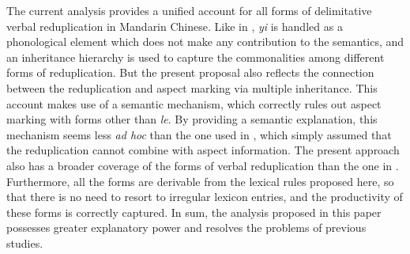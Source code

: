 The current analysis provides a unified account for all forms of delimitative verbal reduplication in Mandarin Chinese.
Like in \citet{FanSongBond2015}, \textit{yi} is handled as a phonological element which does not make any contribution to the semantics,
and an inheritance hierarchy is used to capture the commonalities among different forms of reduplication.
But the present proposal also reflects the connection between the reduplication and aspect marking via multiple inheritance.
This account makes use of a semantic mechanism, which correctly rules out aspect marking with forms other than \textit{le}.
By providing a semantic explanation, this mechanism seems less \textit{ad hoc} than the one used in \citet{FanSongBond2015}, which simply assumed that the reduplication cannot combine with aspect information.
The present approach also has a broader coverage of the forms of verbal reduplication than the one in \citet{FanSongBond2015}.
Furthermore, all the forms are derivable from the lexical rules proposed here, so that there is no need to resort to irregular lexicon entries, and the productivity of these forms is correctly captured.
In sum, the analysis proposed in this paper possesses greater explanatory power and resolves the
problems of previous studies.


